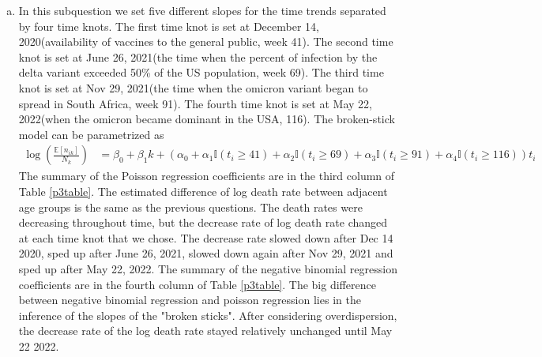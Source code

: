 \documentclass[12pt]{article}
\begin{document}
\begin{enumerate}[(a)]
	\item In this subquestion we set five different slopes for the time trends separated by four time knots. The first time knot is set at December 14, 2020(availability of vaccines to the general public, week 41). The second time knot is set at June 26, 2021(the time when the percent of infection by the delta variant exceeded 50\% of the US population, week 69). The third time knot is set at Nov 29, 2021(the time when the omicron variant began to spread in South Africa, week 91). The fourth time knot is set at May 22, 2022(when the omicron became dominant in the USA, 116). The broken-stick model can be parametrized as
	 \begin{align*}
		\log(\frac{\mathbb{E}[n_{ik}]}{N_{k}}) &= \beta_{0} + \beta_{1}k + \left(\alpha_{0} + \alpha_{1}\mathbb{I}(t_{i} \geq 41) + \alpha_{2}\mathbb{I}(t_{i} \geq 69) +\alpha_{3} \mathbb{I}(t_{i} \geq 91) + \alpha_{4}\mathbb{I}(t_{i} \geq 116)\right) t_{i}
	\end{align*}
	The summary of the Poisson regression coefficients are in the third column of Table \ref{p3table}. The estimated difference of log death rate between adjacent age groups is the same as the previous questions. The death rates were decreasing throughout time, but the decrease rate of log death rate changed at each time knot that we chose. The decrease rate slowed down after Dec 14 2020, sped up after June 26, 2021, slowed down again after Nov 29, 2021 and sped up after May 22, 2022. The summary of the negative binomial regression coefficients are in the fourth column of Table \ref{p3table}. The big difference between negative binomial regression and poisson regression lies in the inference of the slopes of the "broken sticks". After considering overdispersion, the decrease rate of the log death rate stayed relatively unchanged until May 22 2022.
	

\end{enumerate}
\end{document}
